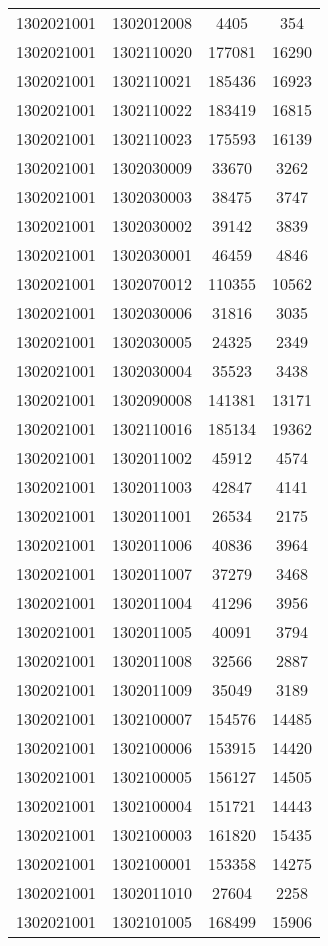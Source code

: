 \begin{longtable}{llcc}
1302021001 & 1302012008 & 4405 & 354\\
1302021001 & 1302110020 & 177081 & 16290\\
1302021001 & 1302110021 & 185436 & 16923\\
1302021001 & 1302110022 & 183419 & 16815\\
1302021001 & 1302110023 & 175593 & 16139\\
1302021001 & 1302030009 & 33670 & 3262\\
1302021001 & 1302030003 & 38475 & 3747\\
1302021001 & 1302030002 & 39142 & 3839\\
1302021001 & 1302030001 & 46459 & 4846\\
1302021001 & 1302070012 & 110355 & 10562\\
1302021001 & 1302030006 & 31816 & 3035\\
1302021001 & 1302030005 & 24325 & 2349\\
1302021001 & 1302030004 & 35523 & 3438\\
1302021001 & 1302090008 & 141381 & 13171\\
1302021001 & 1302110016 & 185134 & 19362\\
1302021001 & 1302011002 & 45912 & 4574\\
1302021001 & 1302011003 & 42847 & 4141\\
1302021001 & 1302011001 & 26534 & 2175\\
1302021001 & 1302011006 & 40836 & 3964\\
1302021001 & 1302011007 & 37279 & 3468\\
1302021001 & 1302011004 & 41296 & 3956\\
1302021001 & 1302011005 & 40091 & 3794\\
1302021001 & 1302011008 & 32566 & 2887\\
1302021001 & 1302011009 & 35049 & 3189\\
1302021001 & 1302100007 & 154576 & 14485\\
1302021001 & 1302100006 & 153915 & 14420\\
1302021001 & 1302100005 & 156127 & 14505\\
1302021001 & 1302100004 & 151721 & 14443\\
1302021001 & 1302100003 & 161820 & 15435\\
1302021001 & 1302100001 & 153358 & 14275\\
1302021001 & 1302011010 & 27604 & 2258\\
1302021001 & 1302101005 & 168499 & 15906\\

\end{longtable}
